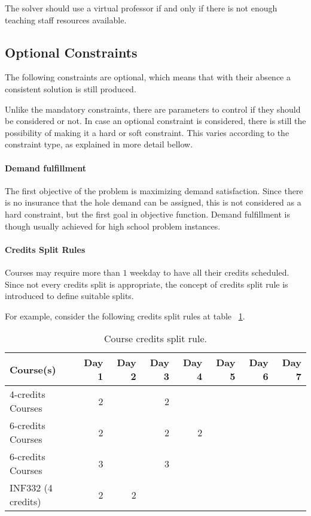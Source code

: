 The solver should use a virtual professor if and only if there is not enough teaching staff resources available.


\subsection{Optional Constraints}
\label{subsec:optional}

The following constraints are optional, which means that with their absence a consistent solution is still produced.

Unlike the mandatory constraints, there are parameters to control if they should be considered or not. In case an optional constraint is considered, there is still the possibility of making it a hard or soft constraint. This varies according to the constraint type, as explained in more detail bellow.


\paragraph{Demand fulfillment}
\label{constrdemandfulfillm}

The first objective of the problem is maximizing demand satisfaction. Since there is no insurance that the hole demand can be assigned, this is not considered as a hard constraint, but the first goal in objective function. Demand fulfillment is though usually achieved for high school problem instances.



\paragraph{Credits Split Rules}
\label{constrsplit}

Courses may require more than $1$ weekday to have all their credits scheduled. Since not every credits split is appropriate, the concept of credits split rule is introduced to define suitable splits.

For example, consider the following credits split rules at table ~\ref{tab:split}.

\begin{table}[H]
\centering
\begin{tabular}{l|r|r|r|r|r|r|r}
Course(s) & Day 1 & Day 2 & Day 3 & Day 4 & Day 5 & Day 6 & Day 7 \\\hline
4-credits Courses & 2 & & 2 & & & & \\
6-credits Courses & 2 & & 2 & 2 & & & \\
6-credits Courses & 3 & & 3 & & & & \\
INF332 (4 credits) & 2 & 2 & & & & & \\
\end{tabular}
\caption{\label{tab:split}Course credits split rule.}
\end{table}

